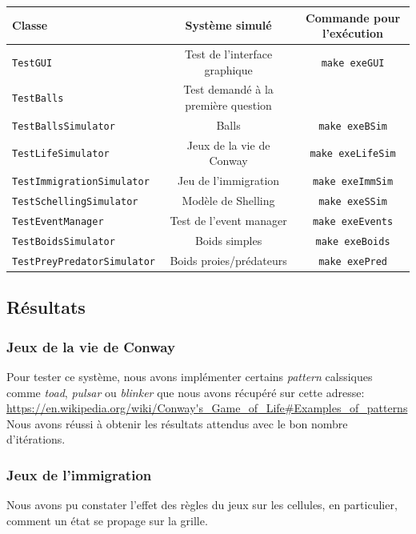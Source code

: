 \documentclass [a4paper,11pt,titlepage] {article}
\begin{document}
\begin{center}
\begin{tabular}{|l|c|c|}
  \hline
    Classe & Système simulé & Commande pour l'exécution \\
  \hline
  \texttt{TestGUI} & Test de l'interface graphique & \texttt{make exeGUI}\\
  \hline
   \texttt{TestBalls} & Test demandé à la première question & \\
  \hline
  \texttt{TestBallsSimulator} & Balls & \texttt{make exeBSim}\\
  \hline
  \texttt{TestLifeSimulator} & Jeux de la vie de Conway & \texttt{make exeLifeSim}\\
  \hline
  \texttt{TestImmigrationSimulator} & Jeu de l'immigration & \texttt{make exeImmSim}\\
  \hline
  \texttt{TestSchellingSimulator} & Modèle de Shelling & \texttt{make exeSSim}\\
  \hline
  \texttt{TestEventManager} & Test de l'event manager & \texttt{make exeEvents}\\
  \hline
  \texttt{TestBoidsSimulator} & Boids simples & \texttt{make exeBoids}\\
  \hline
  \texttt{TestPreyPredatorSimulator} & Boids proies/prédateurs  & \texttt{make exePred}\\
  \hline
  
 
\end{tabular}
\end{center}

\subsection {Résultats}
\subsubsection {Jeux de la vie de Conway}
Pour tester ce système, nous avons implémenter certains \textit{pattern} calssiques comme \textit{toad}, \textit{pulsar} ou \textit{blinker} que nous avons récupéré sur cette adresse: 
\newline
\url{https://en.wikipedia.org/wiki/Conway's_Game_of_Life#Examples_of_patterns}
\newline
Nous avons réussi à obtenir les résultats attendus avec le bon nombre d'itérations.
\subsubsection {Jeux de l'immigration}
Nous avons pu constater l'effet des règles du jeux sur les cellules, en particulier, comment un état se propage sur la grille.
\end{document}

